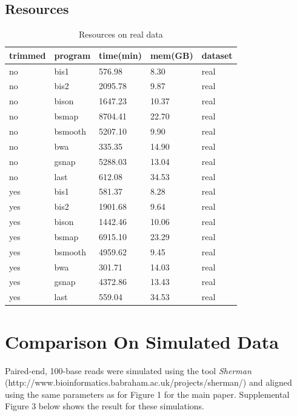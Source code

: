\documentclass[12pt]{article}
\begin{document}
\subsection{Resources}

\begin{table}[H]
    \centering
    \caption{Resources on real data}
    \begin{tabular}{lllll} \hline
    trimmed & program & time(min) & mem(GB) & dataset \\ \hline

no &    bis1 & 576.98 & 8.30 & real \\
no &    bis2 & 2095.78 & 9.87 & real \\
no &    bison & 1647.23 & 10.37 & real \\
no &    bsmap & 8704.41 & 22.70 & real \\
no &    bsmooth & 5207.10 & 9.90 & real \\
no &    bwa & 335.35 & 14.90 & real \\
no &    gsnap & 5288.03 & 13.04 & real \\
no &    last & 612.08 & 34.53 & real \\

yes &    bis1 & 581.37 & 8.28 & real \\
yes &    bis2 & 1901.68 & 9.64 & real \\
yes &    bison & 1442.46 & 10.06 & real \\
yes &    bsmap & 6915.10 & 23.29 & real \\
yes &    bsmooth & 4959.62 & 9.45 & real \\
yes &    bwa & 301.71 & 14.03 & real \\
yes &    gsnap & 4372.86 & 13.43 & real \\
yes &    last & 559.04 & 34.53 & real \\


    \end{tabular}
\end{table}

\section{Comparison On Simulated Data}
Paired-end, 100-base reads were simulated using the tool \emph{Sherman} (http://www.bioinformatics.babraham.ac.uk/projects/sherman/) and aligned using the
same parameters as for Figure 1 for the main paper.
Supplemental Figure 3 below shows the result for these simulations.
\end{document}
